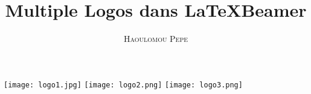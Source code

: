 \documentclass[12pt,aspectratio=169,t]{beamer}
\title{Multiple Logos dans \LaTeX \hspace{1mm}Beamer}
\author{
    {\textsc{Haoulomou Pepe}}\\\vspace{1cm}
    {\color{mycolor}{D1, Kyushu University, Japan}}
}
\date{}
\begin{document}
\begin{frame}[plain]
    \texttt{[image: logo1.jpg]}\hspace{3.5cm}
    \texttt{[image: logo2.png]}
    \hspace{3.5cm}
    \texttt{[image: logo3.png]}
    \maketitle
\end{frame}
\end{document}
